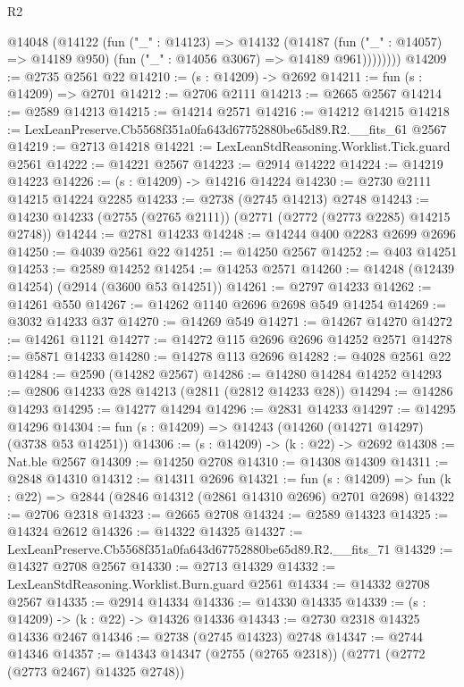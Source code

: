 \begin{lexlean}{R2}
\begin{coremodule}
          @14048
            (@14122
              (fun ("_" : @14123) =>
              @14132
                (@14187
                  (fun ("_" : @14057) => @14189 @950)
                  (fun ("_" : @14056 @3067) => @14189 @961))))))))
@14209 := @2735 @2561 @22
@14210 := (s : @14209) -> @2692
@14211 := fun (s : @14209) => @2701
@14212 := @2706 @2111
@14213 := @2665 @2567
@14214 := @2589 @14213
@14215 := @14214 @2571
@14216 := @14212 @14215
@14218 := LexLeanPreserve.Cb5568f351a0fa643d67752880be65d89.R2.__fits_61 @2567
@14219 := @2713 @14218
@14221 := LexLeanStdReasoning.Worklist.Tick.guard @2561
@14222 := @14221 @2567
@14223 := @2914 @14222
@14224 := @14219 @14223
@14226 := (s : @14209) -> @14216 @14224
@14230 := @2730 @2111 @14215 @14224 @2285
@14233 := @2738 (@2745 @14213) @2748
@14243 := @14230 @14233 (@2755 (@2765 @2111)) (@2771 (@2772 (@2773 @2285) @14215 @2748))
@14244 := @2781 @14233
@14248 := @14244 @400 @2283 @2699 @2696
@14250 := @4039 @2561 @22
@14251 := @14250 @2567
@14252 := @403 @14251
@14253 := @2589 @14252
@14254 := @14253 @2571
@14260 := @14248 (@12439 @14254) (@2914 (@3600 @53 @14251))
@14261 := @2797 @14233
@14262 := @14261 @550
@14267 := @14262 @1140 @2696 @2698 @549 @14254
@14269 := @3032 @14233 @37
@14270 := @14269 @549
@14271 := @14267 @14270
@14272 := @14261 @1121
@14277 := @14272 @115 @2696 @2696 @14252 @2571
@14278 := @5871 @14233
@14280 := @14278 @113 @2696
@14282 := @4028 @2561 @22
@14284 := @2590 (@14282 @2567)
@14286 := @14280 @14284 @14252
@14293 := @2806 @14233 @28 @14213 (@2811 (@2812 @14233 @28))
@14294 := @14286 @14293
@14295 := @14277 @14294
@14296 := @2831 @14233
@14297 := @14295 @14296
@14304 := fun (s : @14209) => @14243 (@14260 (@14271 @14297) (@3738 @53 @14251))
@14306 := (s : @14209) -> (k : @22) -> @2692
@14308 := Nat.ble @2567
@14309 := @14250 @2708
@14310 := @14308 @14309
@14311 := @2848 @14310
@14312 := @14311 @2696
@14321 := fun (s : @14209) => fun (k : @22) => @2844 (@2846 @14312 (@2861 @14310 @2696) @2701 @2698)
@14322 := @2706 @2318
@14323 := @2665 @2708
@14324 := @2589 @14323
@14325 := @14324 @2612
@14326 := @14322 @14325
@14327 := LexLeanPreserve.Cb5568f351a0fa643d67752880be65d89.R2.__fits_71
@14329 := @14327 @2708 @2567
@14330 := @2713 @14329
@14332 := LexLeanStdReasoning.Worklist.Burn.guard @2561
@14334 := @14332 @2708 @2567
@14335 := @2914 @14334
@14336 := @14330 @14335
@14339 := (s : @14209) -> (k : @22) -> @14326 @14336
@14343 := @2730 @2318 @14325 @14336 @2467
@14346 := @2738 (@2745 @14323) @2748
@14347 := @2744 @14346
@14357 := @14343 @14347 (@2755 (@2765 @2318)) (@2771 (@2772 (@2773 @2467) @14325 @2748))

\end{coremodule}
\end{lexlean}
